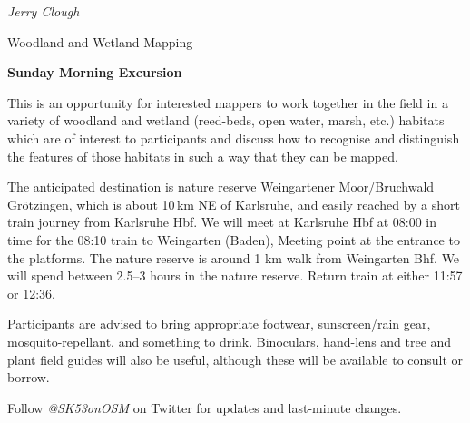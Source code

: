\newcommand{\sundayabstract}[7]%
{%
\newpage%
\ifthispageodd{\ThisCenterWallPaper{1.0}{sunday_r}}{\ThisCenterWallPaper{1.0}{sunday_l}}
\renewcommand{\talktime}{#1}
\renewcommand{\talkroom}{#2}
\thispagestyle{scrheadings}
\noindent \emph{#3}%
\vspace{0.75em}
{\par\noindent\large \sectfont #4}%
\vspace*{0.35em}%
{\par\noindent\bfseries \normalsize \sectfont #5}
\vspace{1em}
\par\noindent #7 \par%
\vspace*{0.35em}%
{\em{#6}}%
\cropmarkswallpaper%
}

\newcommand{\sundayabstractexcursion}[7]%
{%
\newpage%
\ThisCenterWallPaper{1.0}{excursion}
\renewcommand{\talktime}{#1}
\renewcommand{\talkroom}{#2}
\thispagestyle{scrheadings}
\noindent \emph{#3}%
\vspace{0.75em}
{\par\noindent\large \sectfont #4}%
\vspace*{0.35em}%
{\par\noindent\bfseries \normalsize \sectfont #5}
\vspace{1em}
\par\noindent #7 \par%
\vspace*{0.35em}%
{\em{#6}}%
\cropmarkswallpaper%
}

\sundayabstractexcursion{8:00}{Railway Station}{Jerry Clough}{Woodland and Wetland Mapping}%
{Sunday Morning Excursion}%
{}%
{This is an opportunity for interested mappers to work together in the
field in a variety of woodland and wetland (reed-beds, open water, marsh, etc.) habitats which are of interest to participants and discuss how to recognise and distinguish the features of those habitats in such a way that they can be mapped. 

The anticipated destination is nature reserve Weingar\-tener Moor/Bruchwald Grötzingen, which is about 10\,km NE of Karlsruhe, and easily reached by a short train journey from Karlsruhe Hbf. We will meet at Karlsruhe Hbf at 08:00 in time for the 08:10 train to Weingarten (Baden), Meeting point at the entrance to the platforms. The nature reserve is around 1 km walk from Weingarten Bhf. We will spend between 2.5--3 hours in the nature reserve. Return train at either 11:57 or 12:36.

Participants are advised to bring appropriate footwear, sunscreen/rain gear, mosquito-repellant, and something to drink. Binoculars, hand-lens and tree and plant field guides will also be useful, although these will be available to consult or borrow.

Follow \emph{@SK53onOSM} on Twitter for updates and last-minute changes.
}

